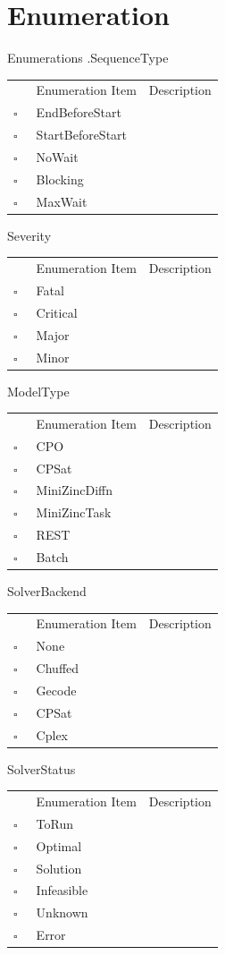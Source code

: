 \chapter{Enumeration}
Enumerations     .SequenceType   
\begin{longtable}{llp{8cm}}
& Enumeration Item & Description \\
$\square$\ & EndBeforeStart &  \\
$\square$\ & StartBeforeStart &  \\
$\square$\ & NoWait &  \\
$\square$\ & Blocking &  \\
$\square$\ & MaxWait &  \\
\end{longtable}
Severity   
\begin{longtable}{llp{8cm}}
& Enumeration Item & Description \\
$\square$\ & Fatal &  \\
$\square$\ & Critical &  \\
$\square$\ & Major &  \\
$\square$\ & Minor &  \\
\end{longtable}
ModelType   
\begin{longtable}{llp{8cm}}
& Enumeration Item & Description \\
$\square$\ & CPO &  \\
$\square$\ & CPSat &  \\
$\square$\ & MiniZincDiffn &  \\
$\square$\ & MiniZincTask &  \\
$\square$\ & REST &  \\
$\square$\ & Batch &  \\
\end{longtable}
SolverBackend   
\begin{longtable}{llp{8cm}}
& Enumeration Item & Description \\
$\square$\ & None &  \\
$\square$\ & Chuffed &  \\
$\square$\ & Gecode &  \\
$\square$\ & CPSat &  \\
$\square$\ & Cplex &  \\
\end{longtable}
SolverStatus   
\begin{longtable}{llp{8cm}}
& Enumeration Item & Description \\
$\square$\ & ToRun &  \\
$\square$\ & Optimal &  \\
$\square$\ & Solution &  \\
$\square$\ & Infeasible &  \\
$\square$\ & Unknown &  \\
$\square$\ & Error &  \\
\end{longtable}
